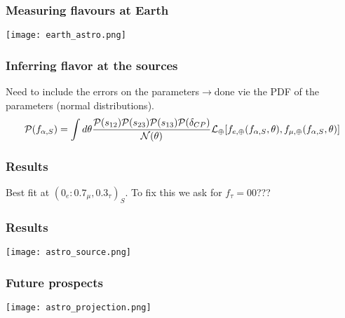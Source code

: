 \documentclass{beamer}
\begin{document}
	\begin{frame}
		\frametitle{Measuring flavours at Earth}
		\begin{center}
			\texttt{[image: earth\_astro.png]}
		\end{center}
	\end{frame}
	\begin{frame}
		\frametitle{Inferring flavor at the sources}
		Need to include the errors on the parameters$\rightarrow$done vie the PDF of the parameters (normal distributions).
		$$\displaystyle\mathcal{P}(f_{\alpha,S})=\int d\theta{\mathcal{P}(s_{12})\mathcal{P}(s_{23})\mathcal{P}(s_{13})\mathcal{P}(\delta_{CP})\over \mathcal{N}(\theta)}\mathcal{L}_\oplus[f_{e,\oplus}(f_{\alpha,S},\theta),f_{\mu,\oplus}(f_{\alpha,S},\theta)]$$
	\end{frame}
	\begin{frame}
		\frametitle{Results}
		Best fit at $(0_e:0.7_\mu,0.3_\tau)_S$.
		To fix this we ask for $f_\tau=00$???
	\end{frame}
	\begin{frame}
		\frametitle{Results}
		\begin{center}
			\texttt{[image: astro\_source.png]}
		\end{center}
	\end{frame}
	\begin{frame}
		\frametitle{Future prospects}
	\begin{center}
		\texttt{[image: astro\_projection.png]}
	\end{center}
	\end{frame}
\end{document}
